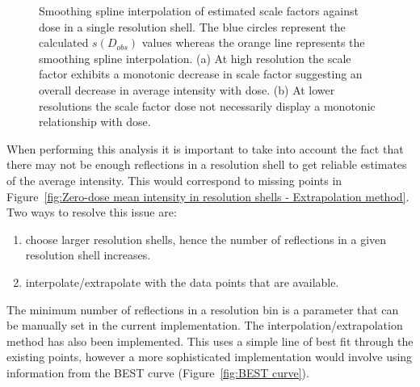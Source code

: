 \begin{figure}
\begin{subfigure}[b]{0.9\textwidth}
                \caption{}
                \label{fig:scale factor not monotonic - Extrapolation method}
        \end{subfigure}
        \caption[Smoothing spline interpolation of estimated scale factors against dose in a single resolution shell.]{Smoothing spline interpolation of estimated scale factors against dose in a single resolution shell.
        The blue circles represent the calculated $s(D_{obs})$ values whereas the orange line represents the smoothing spline interpolation.
        (a) At high resolution the scale factor exhibits a monotonic decrease in scale factor suggesting an overall decrease in average intensity with dose.
        (b) At lower resolutions the scale factor dose not necessarily display a monotonic relationship with dose.}
        \label{fig:Scale factors, smoothing interpolation - Extrapolation method}
\end{figure}

When performing this analysis it is important to take into account the fact that there may not be enough reflections in a resolution shell to get reliable estimates of the average intensity.
This would correspond to missing points in Figure~\ref{fig:Zero-dose mean intensity in resolution shells - Extrapolation method}.
Two ways to resolve this issue are:
\begin{enumerate}
    \item choose larger resolution shells, hence the number of reflections in a given resolution shell increases.
    \item interpolate/extrapolate with the data points that are available.
\end{enumerate}
The minimum number of reflections in a resolution bin is a parameter that can be manually set in the current implementation. The interpolation/extrapolation method has also been implemented.
This uses a simple line of best fit through the existing points, however a more sophisticated implementation would involve using information from the BEST curve (Figure~\ref{fig:BEST curve}).

